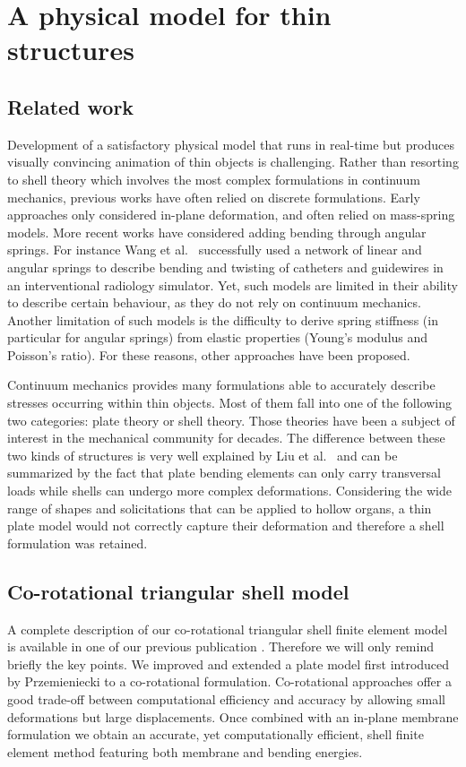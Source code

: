 \documentclass{llncs}
\begin{document}
\section{A physical model for thin structures}

\subsection{Related work}

Development of a satisfactory physical model that runs in real-time but produces visually convincing animation of thin objects is challenging. Rather than resorting to shell theory which involves the most complex formulations in continuum mechanics, previous works have often relied on discrete formulations. Early approaches only considered in-plane deformation, and often relied on mass-spring models. More recent works have considered adding bending through angular springs. For instance Wang et al.~\cite{Wang07} successfully used a network of linear and angular springs to describe bending and twisting of catheters and guidewires in an interventional radiology simulator. Yet, such models are limited in their ability to describe certain behaviour, as they do not rely on continuum mechanics. Another limitation of such models is the difficulty to derive spring stiffness (in particular for angular springs) from elastic properties (Young's modulus and Poisson's ratio). For these reasons, other approaches have been proposed. 

Continuum mechanics provides many formulations able to accurately describe stresses occurring within thin objects. Most of them fall into one of the following two categories: plate theory or shell theory. Those theories have been a subject of interest in the mechanical community for decades. The difference between these two kinds of structures is very well explained by Liu et al.~\cite{Liu03} and can be summarized by the fact that plate bending elements can only carry transversal loads while shells can undergo more complex deformations. Considering the wide range of shapes and solicitations that can be applied to hollow organs, a thin plate model would not correctly capture their deformation and therefore a shell formulation was retained.

\subsection{Co-rotational triangular shell model}

A complete description of our co-rotational triangular shell finite element model is available in one of our previous publication \cite{Comas2010ISBMS}. Therefore we will only remind briefly the key points. We improved and extended a plate model first introduced by Przemieniecki \cite{Przemieniecki68} to a co-rotational formulation. Co-rotational approaches offer a good trade-off between computational efficiency and accuracy by allowing small deformations but large displacements. Once combined with an in-plane membrane formulation we obtain an accurate, yet computationally efficient, shell finite element method featuring both membrane and bending energies. 
\end{document}
